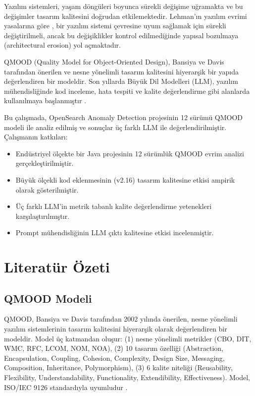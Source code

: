 \documentclass[conference]{IEEEtran}
\begin{document}
Yaz{\i}l{\i}m sistemleri, ya\c{s}am d\"ong\"uleri boyunca s\"urekli de\u{g}i\c{s}ime u\u{g}ramakta ve bu de\u{g}i\c{s}imler tasar{\i}m kalitesini do\u{g}rudan etkilemektedir. Lehman'{\i}n yaz{\i}l{\i}m evrimi yasalar{\i}na g\"ore \cite{lehman1996}, bir yaz{\i}l{\i}m sistemi \c{c}evresine uyum sa\u{g}lamak i\c{c}in s\"urekli de\u{g}i\c{s}tirilmeli, ancak bu de\u{g}i\c{s}iklikler kontrol edilmedi\u{g}inde yap{\i}sal bozulmaya (architectural erosion) yol a\c{c}maktad{\i}r.

QMOOD (Quality Model for Object-Oriented Design), Bansiya ve Davis \cite{bansiya2002} taraf{\i}ndan \"onerilen ve nesne y\"onelimli tasar{\i}m kalitesini hiyerar\c{s}ik bir yap{\i}da de\u{g}erlendiren bir modeldir. Son y{\i}llarda B\"uy\"uk Dil Modelleri (LLM), yaz{\i}l{\i}m m\"uhendisli\u{g}inde kod inceleme, hata tespiti ve kalite de\u{g}erlendirme gibi alanlarda kullan{\i}lmaya ba\c{s}lanm{\i}\c{s}t{\i}r \cite{fan2023}.

Bu \c{c}al{\i}\c{s}mada, OpenSearch Anomaly Detection projesinin 12 s\"ur\"um\"u QMOOD modeli ile analiz edilmi\c{s} ve sonu\c{c}lar \"u\c{c} farkl{\i} LLM ile de\u{g}erlendirilmi\c{s}tir. \c{C}al{\i}\c{s}man{\i}n katk{\i}lar{\i}:

\begin{itemize}
\item End\"ustriyel \"ol\c{c}ekte bir Java projesinin 12 s\"ur\"uml\"uk QMOOD evrim analizi ger\c{c}ekle\c{s}tirilmi\c{s}tir.
\item B\"uy\"uk \"ol\c{c}ekli kod eklenmesinin (v2.16) tasar{\i}m kalitesine etkisi ampirik olarak g\"osterilmi\c{s}tir.
\item \"U\c{c} farkl{\i} LLM'in metrik tabanl{\i} kalite de\u{g}erlendirme yetenekleri kar\c{s}{\i}la\c{s}t{\i}r{\i}lm{\i}\c{s}t{\i}r.
\item Prompt m\"uhendisli\u{g}inin LLM \c{c}{\i}kt{\i} kalitesine etkisi incelenmi\c{s}tir.
\end{itemize}

\section{Literat\"ur \"Ozeti}

\subsection{QMOOD Modeli}
QMOOD, Bansiya ve Davis \cite{bansiya2002} taraf{\i}ndan 2002 y{\i}l{\i}nda \"onerilen, nesne y\"onelimli yaz{\i}l{\i}m sistemlerinin tasar{\i}m kalitesini hiyerar\c{s}ik olarak de\u{g}erlendiren bir modeldir. Model \"u\c{c} katmandan olu\c{s}ur: (1) nesne y\"onelimli metrikler (CBO, DIT, WMC, RFC, LCOM, NOM, NOA), (2) 10 tasar{\i}m \"ozelli\u{g}i (Abstraction, Encapsulation, Coupling, Cohesion, Complexity, Design Size, Messaging, Composition, Inheritance, Polymorphism), (3) 6 kalite niteli\u{g}i (Reusability, Flexibility, Understandability, Functionality, Extendibility, Effectiveness). Model, ISO/IEC 9126 standard{\i}yla uyumludur \cite{iso9126}.
\end{document}
